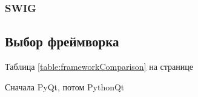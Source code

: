 \documentclass[14pt]{matmex-diploma-custom}
\begin{document}



\subsubsection{SWIG}

\subsection{Выбор фреймворка}

Таблица \ref{table:frameworkComparison} на странице \pageref{table:frameworkComparison}

Сначала PyQt, потом PythonQt

\end{document}

